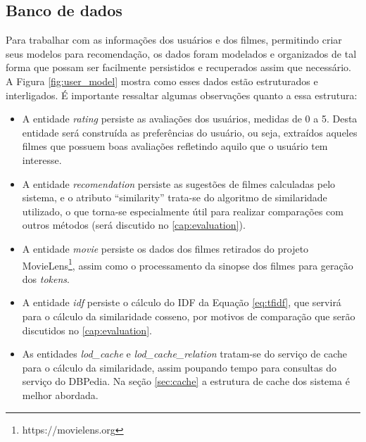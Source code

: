 \subsection{Banco de dados}

Para trabalhar com as informações dos usuários e dos filmes, permitindo criar seus modelos para recomendação, os dados foram modelados e organizados de tal forma que possam ser facilmente persistidos e recuperados assim que necessário. A Figura \ref{fig:user_model} mostra como esses dados estão estruturados e interligados. É importante ressaltar algumas observações quanto a essa estrutura:

\begin{itemize}
	\item{A entidade \textit{rating} persiste as avaliações dos usuários, medidas de 0 a 5. Desta entidade será construída as preferências do usuário, ou seja, extraídos aqueles filmes que possuem boas avaliações refletindo aquilo que o usuário tem interesse.}

	\item{A entidade \textit{recomendation} persiste as sugestões de filmes calculadas pelo sistema, e o atributo \enquote{similarity} trata-se do algoritmo de similaridade utilizado, o que torna-se especialmente útil para realizar comparações com outros métodos (será discutido no \ref{cap:evaluation}).}

	\item{A entidade \textit{movie} persiste os dados dos filmes retirados do projeto MovieLens\footnote{https://movielens.org}, assim como o processamento da sinopse dos filmes para geração dos \textit{tokens}.}

	\item{A entidade \textit{idf} persiste o cálculo do \ac{IDF} da Equação \ref{eq:tfidf}, que servirá para o cálculo da similaridade cosseno, por motivos de comparação que serão discutidos no \ref{cap:evaluation}.}

	\item{As entidades \textit{lod\_cache} e \textit{lod\_cache\_relation} tratam-se do serviço de cache para o cálculo da similaridade, assim poupando tempo para consultas do serviço do DBPedia. Na seção \ref{sec:cache} a estrutura de cache dos sistema é melhor abordada.}
\end{itemize}

